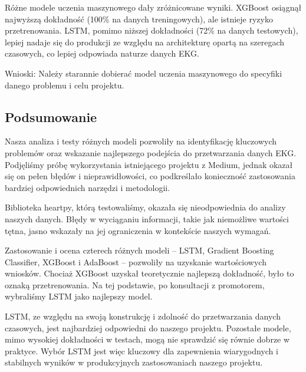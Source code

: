 \documentclass[12pt,a4paper]{article}
\begin{document}
Różne modele uczenia maszynowego dały zróżnicowane wyniki.
XGBoost osiągnął najwyższą dokładność (100\% na danych treningowych), ale istnieje ryzyko przetrenowania.
LSTM, pomimo niższej dokładności (72\% na danych testowych), lepiej nadaje się do produkcji ze względu na architekturę opartą na szeregach czasowych, co lepiej odpowiada naturze danych EKG.

Wnioski: Należy starannie dobierać model uczenia maszynowego do specyfiki danego problemu i celu projektu.

\subsection{Podsumowanie}
Nasza analiza i testy różnych modeli pozwoliły na identyfikację kluczowych problemów oraz wskazanie najlepszego podejścia do przetwarzania danych EKG. Podjęliśmy próbę wykorzystania istniejącego projektu z Medium, jednak okazał się on pełen błędów i nieprawidłowości, co podkreślało konieczność zastosowania bardziej odpowiednich narzędzi i metodologii.

Biblioteka heartpy, którą testowaliśmy, okazała się nieodpowiednia do analizy naszych danych. Błędy w wyciąganiu informacji, takie jak niemożliwe wartości tętna, jasno wskazały na jej ograniczenia w kontekście naszych wymagań.

Zastosowanie i ocena czterech różnych modeli – LSTM, Gradient Boosting Classifier, XGBoost i AdaBoost – pozwoliły na uzyskanie wartościowych wniosków. Chociaż XGBoost uzyskał teoretycznie najlepszą dokładność, było to oznaką przetrenowania. Na tej podstawie, po konsultacji z promotorem, wybraliśmy LSTM jako najlepszy model.

LSTM, ze względu na swoją konstrukcję i zdolność do przetwarzania danych czasowych, jest najbardziej odpowiedni do naszego projektu. Pozostałe modele, mimo wysokiej dokładności w testach, mogą nie sprawdzić się równie dobrze w praktyce. Wybór LSTM jest więc kluczowy dla zapewnienia wiarygodnych i stabilnych wyników w produkcyjnych zastosowaniach naszego projektu.

\newpage


\end{document}
